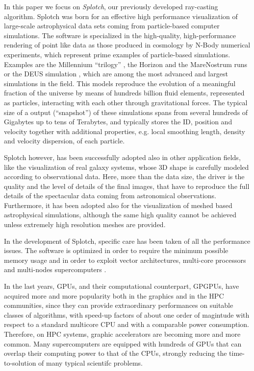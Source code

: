 \documentclass[11pt]{article}
\begin{document}
In this paper we focus on {\it Splotch}, our previously developed ray-casting
algorithm. Splotch was born for an effective high performance visualization of large-scale 
astrophysical data sets coming from particle-based computer simulations. The software is 
specialized in the high-quality, high-performance rendering of point like data as those 
produced in cosmology by N-Body numerical experiments, which 
represent prime examples of particle-based simulations. Examples are 
the Millennium ``trilogy'' \cite{millennium}, the Horizon and the
MareNostrum runs \cite{horizon} or the DEUS simulation \cite{deus}, which
are among the most advanced and largest simulations in the field. 
This models reproduce the evolution of a meaningful fraction
of the universe by means of hundreds billion fluid elements, represented as particles,
interacting with each other through gravitational
forces. The typical size of a output (``snapshot'') of these simulations spans from several hundreds 
of Gigabytes up to tens of Terabytes, and typically stores the
ID, position and velocity together with additional properties, e.g.
local smoothing length, density and velocity dispersion, of each particle.

Splotch however, has been successfully adopted also in other application fields,
like the visualization of real galaxy systems, whose 3D shape is carefully modeled
according to observational data. Here, more than the data size, the driver is
the quality and the level of details of the final images,
that have to reproduce the full details of the
spectacular data coming from astronomical observations. Furthermore,
it has been adopted also for the visualization of meshed based astrophysical simulations, 
although the same high quality cannot be achieved unless extremely high resolution
meshes are provided. 

In the development of Splotch, specific care has been taken of all the performance 
issues. The software is optimized in order to require the minimum possible
memory usage and in order to exploit vector architectures, multi-core processors 
and multi-nodes supercomputers \cite{jin:high-performance}. 

In the last years, 
GPUs, and their computational counterpart, GPGPUs, have 
acquired more and more popularity both in the graphics and in the HPC 
communities, since they can provide extraordinary performances on suitable
classes of algorithms, with speed-up factors of about one order of magintude with respect to 
a standard multicore CPU and with a comparable power consumption.
Therefore, on HPC systems, graphic accelerators are becoming more and more common. 
Many supercomputers are equipped with hundreds of GPUs that can overlap 
their computing power to that of the CPUs, strongly reducing the time-to-solution
of many typical scientifc problems.
\end{document}
